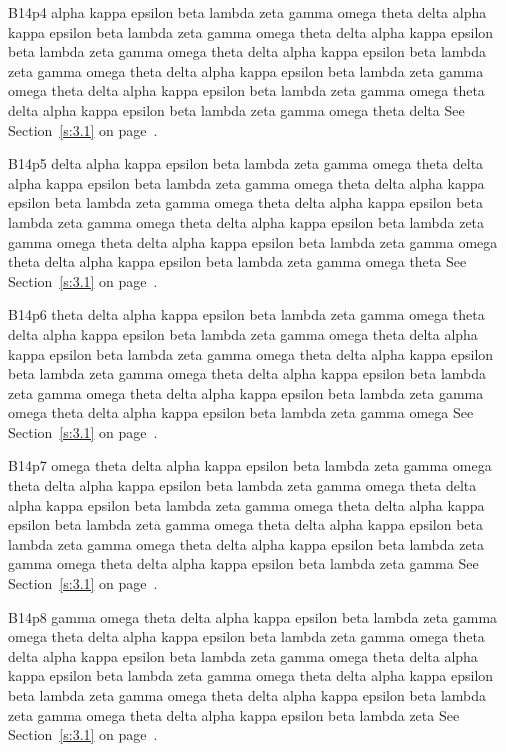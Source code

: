B14p4 alpha kappa epsilon beta lambda zeta gamma omega theta delta alpha kappa epsilon beta lambda zeta gamma omega theta delta alpha kappa epsilon beta lambda zeta gamma omega theta delta alpha kappa epsilon beta lambda zeta gamma omega theta delta alpha kappa epsilon beta lambda zeta gamma omega theta delta alpha kappa epsilon beta lambda zeta gamma omega theta delta alpha kappa epsilon beta lambda zeta gamma omega theta delta See Section~\ref{s:3.1} on page~\pageref{s:3.1}.

B14p5 delta alpha kappa epsilon beta lambda zeta gamma omega theta delta alpha kappa epsilon beta lambda zeta gamma omega theta delta alpha kappa epsilon beta lambda zeta gamma omega theta delta alpha kappa epsilon beta lambda zeta gamma omega theta delta alpha kappa epsilon beta lambda zeta gamma omega theta delta alpha kappa epsilon beta lambda zeta gamma omega theta delta alpha kappa epsilon beta lambda zeta gamma omega theta See Section~\ref{s:3.1} on page~\pageref{s:3.1}.

B14p6 theta delta alpha kappa epsilon beta lambda zeta gamma omega theta delta alpha kappa epsilon beta lambda zeta gamma omega theta delta alpha kappa epsilon beta lambda zeta gamma omega theta delta alpha kappa epsilon beta lambda zeta gamma omega theta delta alpha kappa epsilon beta lambda zeta gamma omega theta delta alpha kappa epsilon beta lambda zeta gamma omega theta delta alpha kappa epsilon beta lambda zeta gamma omega See Section~\ref{s:3.1} on page~\pageref{s:3.1}.

B14p7 omega theta delta alpha kappa epsilon beta lambda zeta gamma omega theta delta alpha kappa epsilon beta lambda zeta gamma omega theta delta alpha kappa epsilon beta lambda zeta gamma omega theta delta alpha kappa epsilon beta lambda zeta gamma omega theta delta alpha kappa epsilon beta lambda zeta gamma omega theta delta alpha kappa epsilon beta lambda zeta gamma omega theta delta alpha kappa epsilon beta lambda zeta gamma See Section~\ref{s:3.1} on page~\pageref{s:3.1}.

B14p8 gamma omega theta delta alpha kappa epsilon beta lambda zeta gamma omega theta delta alpha kappa epsilon beta lambda zeta gamma omega theta delta alpha kappa epsilon beta lambda zeta gamma omega theta delta alpha kappa epsilon beta lambda zeta gamma omega theta delta alpha kappa epsilon beta lambda zeta gamma omega theta delta alpha kappa epsilon beta lambda zeta gamma omega theta delta alpha kappa epsilon beta lambda zeta See Section~\ref{s:3.1} on page~\pageref{s:3.1}.

